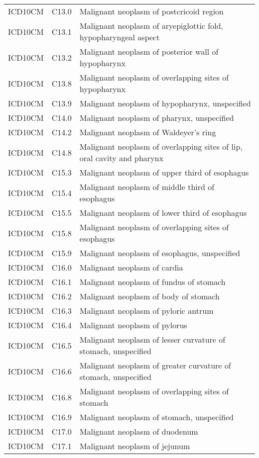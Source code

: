 \begin{longtable}{p{}p{}p{}}
  ICD10CM & C13.0 & Malignant neoplasm of postcricoid region \\ 
  ICD10CM & C13.1 & Malignant neoplasm of aryepiglottic fold, hypopharyngeal aspect \\ 
  ICD10CM & C13.2 & Malignant neoplasm of posterior wall of hypopharynx \\ 
  ICD10CM & C13.8 & Malignant neoplasm of overlapping sites of hypopharynx \\ 
  ICD10CM & C13.9 & Malignant neoplasm of hypopharynx, unspecified \\ 
  ICD10CM & C14.0 & Malignant neoplasm of pharynx, unspecified \\ 
  ICD10CM & C14.2 & Malignant neoplasm of Waldeyer's ring \\ 
  ICD10CM & C14.8 & Malignant neoplasm of overlapping sites of lip, oral cavity and pharynx \\ 
  ICD10CM & C15.3 & Malignant neoplasm of upper third of esophagus \\ 
  ICD10CM & C15.4 & Malignant neoplasm of middle third of esophagus \\ 
  ICD10CM & C15.5 & Malignant neoplasm of lower third of esophagus \\ 
  ICD10CM & C15.8 & Malignant neoplasm of overlapping sites of esophagus \\ 
  ICD10CM & C15.9 & Malignant neoplasm of esophagus, unspecified \\ 
  ICD10CM & C16.0 & Malignant neoplasm of cardia \\ 
  ICD10CM & C16.1 & Malignant neoplasm of fundus of stomach \\ 
  ICD10CM & C16.2 & Malignant neoplasm of body of stomach \\ 
  ICD10CM & C16.3 & Malignant neoplasm of pyloric antrum \\ 
  ICD10CM & C16.4 & Malignant neoplasm of pylorus \\ 
  ICD10CM & C16.5 & Malignant neoplasm of lesser curvature of stomach, unspecified \\ 
  ICD10CM & C16.6 & Malignant neoplasm of greater curvature of stomach, unspecified \\ 
  ICD10CM & C16.8 & Malignant neoplasm of overlapping sites of stomach \\ 
  ICD10CM & C16.9 & Malignant neoplasm of stomach, unspecified \\ 
  ICD10CM & C17.0 & Malignant neoplasm of duodenum \\ 
  ICD10CM & C17.1 & Malignant neoplasm of jejunum \\ 

\end{longtable}
